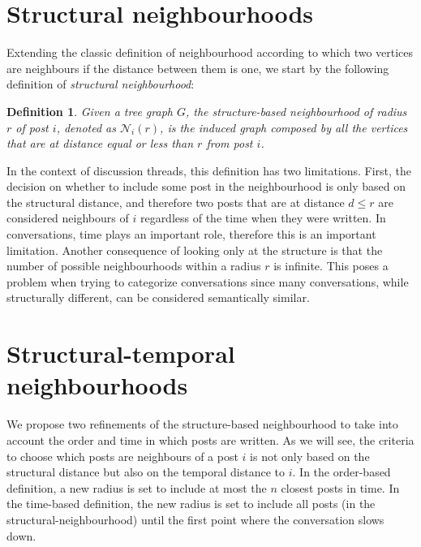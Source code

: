 \documentclass[conference]{IEEEtran}
\newtheorem{definition}{Definition}
\begin{document}



\section{Structural neighbourhoods}\label{sec:structural}
Extending the classic definition of neighbourhood according to which two vertices are neighbours if the distance between them is one, we start by the following definition of \textit{structural neighbourhood}:

\begin{definition}
Given a tree graph $G$, the \textit{structure-based neighbourhood} of radius $r$ of post $i$, denoted as $\mathcal{N}_i(r)$, is the induced graph composed by all the vertices that are at distance equal or less than $r$ from post $i$.
\end{definition}
In the context of discussion threads, this definition has two limitations. First, the decision on whether to include some post in the neighbourhood is only based on the structural distance, and therefore two posts that are at distance $d\leq r$ are considered neighbours of $i$ regardless of the time when they were written. In conversations, time plays an important role, therefore this is an important limitation. Another consequence of looking only at the structure is that the number of possible neighbourhoods within a radius $r$ is infinite. This poses a problem when trying to categorize conversations since many conversations, while structurally different, can be considered semantically similar.

\section{Structural-temporal neighbourhoods}\label{sec:temporal}
We propose two refinements of the structure-based neighbourhood to take into account the order and time in which posts are written. As we will see, the criteria to choose which posts are neighbours of a post $i$  is not only based on the structural distance but also on the temporal distance to $i$. In the order-based definition, a new radius is set to include at most the $n$ closest posts in time.  In the time-based definition, the new radius is set to include all posts (in the structural-neighbourhood) until the first point where the conversation slows down. 
\end{document}
